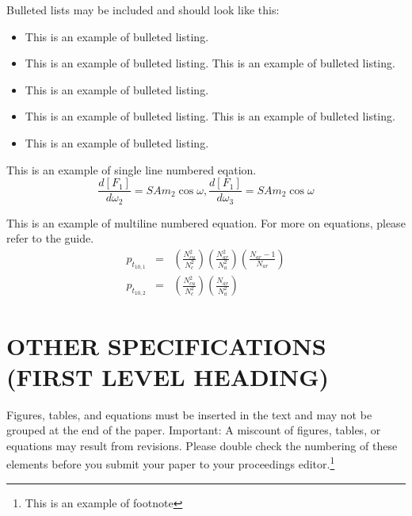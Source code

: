 \documentclass{aip-cp}
\begin{document}
\noindent Bulleted lists may be included and should look like this:

\begin{itemize}
\item This is an example of bulleted listing.
\item This is an example of bulleted listing. This is an example of bulleted listing.
\item This is an example of bulleted listing.
\item This is an example of bulleted listing. This is an example of bulleted listing.
\item This is an example of bulleted listing.
\end{itemize}

\noindent This is an example of single line numbered eqation.
\begin{equation}
\frac{d[F_1]}{d\omega_2} = SAm_2\cos\omega,\frac{d[F_1]}{d\omega_3}= SAm_2\cos\omega
\end{equation}

This is an example of multiline numbered equation. For more on equations, please refer to the guide.
\begin{eqnarray}
p_{t_{10,1}}&=&\left(\frac{N_{cu}^2}{ N_c ^2}\right)\left(\frac{N_{ar}^2}{N_a^2}\right)\left(\frac{N_{ar}-1}{N_{ar}}\right)\\
p_{t_{10,2}}&=&\left(\frac{N_{cu}^2}{ N_c ^2}\right)\left(\frac{N_{ar}}{N_a^2}\right)
\end{eqnarray}

\section{OTHER SPECIFICATIONS (FIRST LEVEL HEADING)}
Figures, tables, and equations must be inserted in the text and may not be grouped at the end of the paper. Important: A miscount of figures, tables, or equations may result from revisions. Please double check the numbering of these elements before you submit your paper to your proceedings editor.\footnote{This is an example of footnote}
\end{document}
